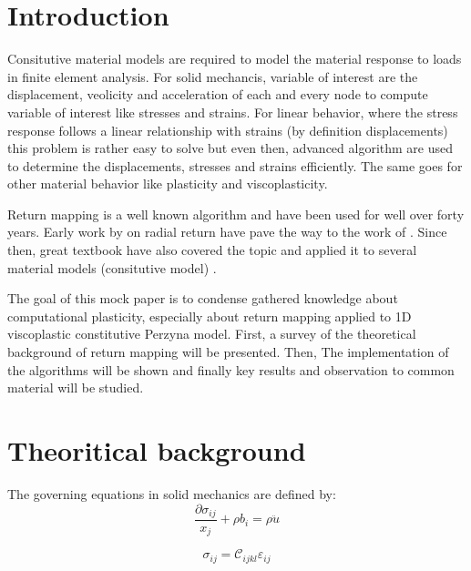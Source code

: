 \documentclass[final,5p,times,twocolumn]{elsarticle}
\begin{document}

\section{Introduction}
\label{Intro}
Consitutive material models are required to model the material response to loads in finite element analysis. For solid mechancis, variable of interest are the displacement, veolicity and acceleration of each and every node to compute variable of interest like stresses and strains. For linear behavior, where the stress response follows a linear relationship with strains (by definition displacements) this problem is rather easy to solve but even then, advanced algorithm are used to determine the displacements, stresses and strains efficiently. The same goes for other material behavior like plasticity and viscoplasticity.

Return mapping is a well known algorithm and have been used for well over forty years. Early work by \cite{Krieg1977RadialReturn} on radial return have pave the way to the work of \cite{Ortiz1985ElastoplasticIntegration}. Since then, great textbook have also covered the topic and applied it to several material models (consitutive model)\cite{Simo1998Computational} \cite{MACrisfield2012}.

The goal of this mock paper is to condense gathered knowledge about computational plasticity, especially about return mapping applied to 1D viscoplastic constitutive Perzyna model. First, a survey of the theoretical background of return mapping will be presented. Then, The implementation of the algorithms will be shown and finally key results and observation to common material will be studied.

\section{Theoritical background}
\label{Theoritical background}
The governing equations in solid mechanics are defined by:
\begin{equation}
  \dfrac{\partial \sigma_{ij}}{x_{j}} + \rho b_{i} = \rho \ddot{u} \label{eq:equilibrium}
\end{equation}

\begin{equation}
   \sigma_{ij}=\mathcal{C}_{ijkl} \varepsilon_{ij} \label{eq:constitutive}
\end{equation} 
\end{document}

